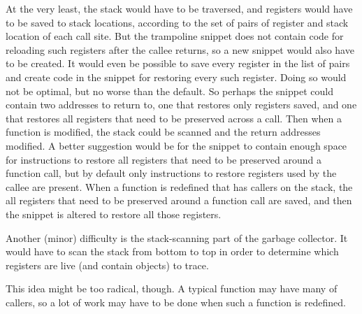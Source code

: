 At the very least, the stack would have to be traversed, and registers
would have to be saved to stack locations, according to the set of
pairs of register and stack location of each call site.  But the
trampoline snippet does not contain code for reloading such registers
after the callee returns, so a new snippet would also have to be
created.  It would even be possible to save every register in the list
of pairs and create code in the snippet for restoring every such
register.  Doing so would not be optimal, but no worse than the
default.  So perhaps the snippet could contain two addresses to return
to, one that restores only registers saved, and one that restores all
registers that need to be preserved across a call.  Then when a
function is modified, the stack could be scanned and the return
addresses modified.  A better suggestion would be for the snippet to
contain enough space for instructions to restore all registers that
need to be preserved around a function call, but by default only
instructions to restore registers used by the callee are present.
When a function is redefined that has callers on the stack, the all
registers that need to be preserved around a function call are saved,
and then the snippet is altered to restore all those registers.

Another (minor) difficulty is the stack-scanning part of the garbage
collector.  It would have to scan the stack from bottom to top in
order to determine which registers are live (and contain \commonlisp{}
objects) to trace.

This idea might be too radical, though.  A typical function may have
many of callers, so a lot of work may have to be done when such a
function is redefined.

